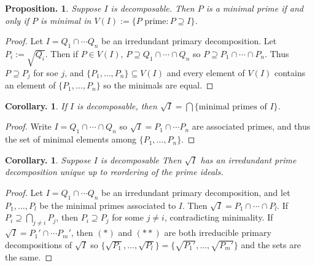 \documentclass[11pt, a4paper]{memoir}
\theoremstyle{change}
\newtheorem{corollary}[theorem]{Corollary.}
\newtheorem{proposition}[theorem]{Proposition.}
\theoremstyle{plain}
\theoremstyle{nonumberplain}
\newtheorem{proof}{Proof}
\numberwithin{equation}{section}
\begin{document}
\begin{proposition}
    Suppose $I$ is decomposable.
    Then $P$ is a minimal prime if and only if $P$ is minimal in $V(I):=\{P\text{ prime}:P\supseteq I\}$.
\end{proposition}
\begin{proof}
    Let $I=Q_1\cap\cdots Q_n$ be an irredundant primary decomposition.
    Let $P_i:=\sqrt{Q_i}$.
    Then if $P\in V(I)$, $P\supseteq Q_1\cap\cdots\cap Q_n$ so $P\supseteq P_1\cap\cdots\cap P_n$.
    Thus $P\supseteq P_j$ for soe $j$, and $\{P_1,\ldots,P_n\}\subseteq V(I)$ and every element of $V(I)$ contains an element of $\{P_1,\ldots,P_n\}$ so the minimals are equal.
\end{proof}
\begin{corollary}
    If $I$ is decomposable, then $\sqrt{I}=\bigcap\{\text{minimal primes of $I$}\}$.
\end{corollary}
\begin{proof}
    Write $I=Q_1\cap\cdots\cap Q_n$ so $\sqrt{I}=P_1\cap\cdots P_n$ are associated primes, and thus the set of minimal elements among $\{P_1,\ldots,P_n\}$.
\end{proof}
\begin{corollary}
    Suppose $I$ is decomposable
    Then $\sqrt{I}$ has an irredundant prime decomposition unique up to reordering of the prime ideals.
\end{corollary}
\begin{proof}
    Let $I=Q_1\cap\cdots Q_n$ be an irredundant primary decomposition, and let $P_1,\ldots,P_l$ be the minimal primes associated to $I$.
    Then $\sqrt{I}=P_1\cap\cdots\cap P_l$.
    If $P_i\supseteq\bigcap_{j\neq i}P_j$, then $P_i\supseteq P_j$ for some $j\neq i$, contradicting minimality.
    If $\sqrt{I}=P_1'\cap\cdots P_m'$, then $(*)$ and $(**)$ are both irreducible primary decompositions of $\sqrt{I}$ so $\{\sqrt{P_1},\ldots,\sqrt{P_l}\}=\{\sqrt{P_1'},\ldots,\sqrt{P_m'}\}$ and the sets are the same.
\end{proof}
\end{document}
